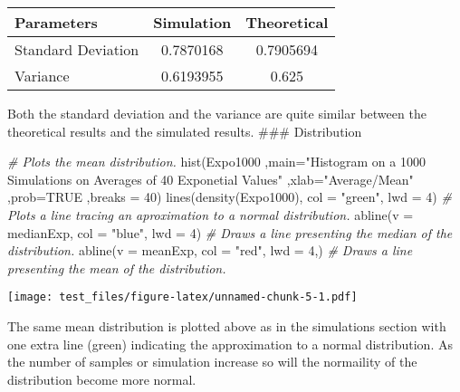 \documentclass[
]{article}
\newenvironment{Shaded}{\begin{snugshade}}{\end{snugshade}}
\newcommand{\AttributeTok}[1]{\textcolor[rgb]{0.77,0.63,0.00}{#1}}
\newcommand{\CommentTok}[1]{\textcolor[rgb]{0.56,0.35,0.01}{\textit{#1}}}
\newcommand{\ConstantTok}[1]{\textcolor[rgb]{0.00,0.00,0.00}{#1}}
\newcommand{\DecValTok}[1]{\textcolor[rgb]{0.00,0.00,0.81}{#1}}
\newcommand{\FunctionTok}[1]{\textcolor[rgb]{0.00,0.00,0.00}{#1}}
\newcommand{\NormalTok}[1]{#1}
\newcommand{\StringTok}[1]{\textcolor[rgb]{0.31,0.60,0.02}{#1}}
\begin{document}
\begin{longtable}[]{@{}lcc@{}}
\toprule
Parameters & Simulation & Theoretical \\
\midrule
\endhead
Standard Deviation & 0.7870168 & 0.7905694 \\
Variance & 0.6193955 & 0.625 \\
\bottomrule
\end{longtable}

Both the standard deviation and the variance are quite similar between
the theoretical results and the simulated results. \#\#\# Distribution

\begin{Shaded}
\begin{Highlighting}[]
\CommentTok{\# Plots the mean distribution.}
\FunctionTok{hist}\NormalTok{(Expo1000}
\NormalTok{     ,}\AttributeTok{main=}\StringTok{"Histogram on a 1000 Simulations on Averages of 40 Exponetial Values"}
\NormalTok{     ,}\AttributeTok{xlab=}\StringTok{"Average/Mean"}
\NormalTok{     ,}\AttributeTok{prob=}\ConstantTok{TRUE}
\NormalTok{     ,}\AttributeTok{breaks =} \DecValTok{40}\NormalTok{)}
\FunctionTok{lines}\NormalTok{(}\FunctionTok{density}\NormalTok{(Expo1000), }\AttributeTok{col =} \StringTok{"green"}\NormalTok{, }\AttributeTok{lwd =} \DecValTok{4}\NormalTok{) }\CommentTok{\# Plots a line tracing an aproximation to a normal distribution.}
\FunctionTok{abline}\NormalTok{(}\AttributeTok{v =}\NormalTok{ medianExp, }\AttributeTok{col =} \StringTok{"blue"}\NormalTok{, }\AttributeTok{lwd =} \DecValTok{4}\NormalTok{) }\CommentTok{\# Draws a line presenting the median of the distribution.}
\FunctionTok{abline}\NormalTok{(}\AttributeTok{v =}\NormalTok{ meanExp, }\AttributeTok{col =} \StringTok{"red"}\NormalTok{, }\AttributeTok{lwd =} \DecValTok{4}\NormalTok{,) }\CommentTok{\# Draws a line presenting the mean of the distribution.}
\end{Highlighting}
\end{Shaded}

\texttt{[image: test\_files/figure-latex/unnamed-chunk-5-1.pdf]}

The same mean distribution is plotted above as in the simulations
section with one extra line (green) indicating the approximation to a
normal distribution. As the number of samples or simulation increase so
will the normaility of the distribution become more normal.
\end{document}
